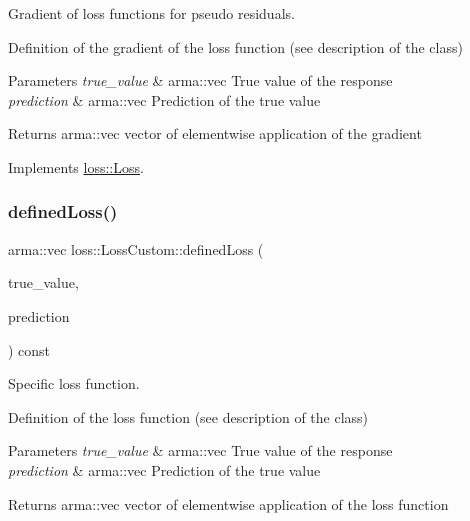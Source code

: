 Gradient of loss functions for pseudo residuals. 

Definition of the gradient of the loss function (see description of the class)


\begin{DoxyParams}{Parameters}
{\em true\+\_\+value} & {\ttfamily arma\+::vec} True value of the response \\
\hline
{\em prediction} & {\ttfamily arma\+::vec} Prediction of the true value\\
\hline
\end{DoxyParams}
\begin{DoxyReturn}{Returns}
{\ttfamily arma\+::vec} vector of elementwise application of the gradient 
\end{DoxyReturn}


Implements \mbox{\hyperlink{classloss_1_1_loss_a267a4de70747ade4b2d84ce35a448979}{loss\+::\+Loss}}.

\mbox{\label{classloss_1_1_loss_custom_ad71351d35d7739651c487c2106571118}} 
\subsubsection{\texorpdfstring{defined\+Loss()}{definedLoss()}}
{\footnotesize\ttfamily arma\+::vec loss\+::\+Loss\+Custom\+::defined\+Loss (\begin{DoxyParamCaption}\item[{const arma\+::vec \&}]{true\+\_\+value,  }\item[{const arma\+::vec \&}]{prediction }\end{DoxyParamCaption}) const\hspace{0.3cm}{\ttfamily [virtual]}}



Specific loss function. 

Definition of the loss function (see description of the class)


\begin{DoxyParams}{Parameters}
{\em true\+\_\+value} & {\ttfamily arma\+::vec} True value of the response \\
\hline
{\em prediction} & {\ttfamily arma\+::vec} Prediction of the true value\\
\hline
\end{DoxyParams}
\begin{DoxyReturn}{Returns}
{\ttfamily arma\+::vec} vector of elementwise application of the loss function 
\end{DoxyReturn}


